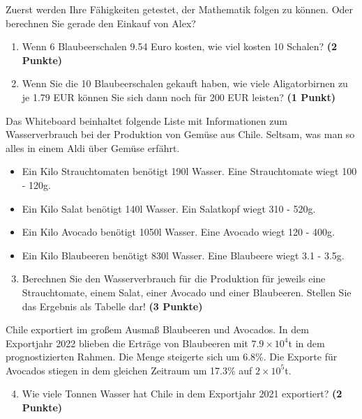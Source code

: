 \documentclass[a4paper, 9pt]{scrartcl}\usepackage[]{graphicx}\usepackage[]{xcolor}
\begin{document}
Zuerst werden Ihre Fähigkeiten getestet, der Mathematik folgen zu können. Oder berechnen Sie gerade den Einkauf von Alex?\\

\begin{enumerate}
\item Wenn 6 Blaubeerschalen 9.54 Euro kosten,  wie viel kosten 10 Schalen? \textbf{(2 Punkte)}
\item Wenn Sie die 10 Blaubeerschalen gekauft haben, wie viele Aligatorbirnen zu je 1.79 EUR können Sie sich dann noch für 200 EUR leisten? \textbf{(1 Punkt)}
\end{enumerate}

Das Whiteboard beinhaltet folgende Liste mit Informationen zum Wasserverbrauch bei der Produktion von Gemüse aus Chile. Seltsam, was man so alles in einem Aldi über Gemüse erfährt.
  
\begin{itemize}[noitemsep]
\item Ein Kilo Strauchtomaten benötigt 190l Wasser. Eine Strauchtomate wiegt 100 - 120g.
\item Ein Kilo Salat benötigt 140l Wasser. Ein Salatkopf wiegt 310 - 520g.
\item Ein Kilo Avocado benötigt 1050l Wasser. Eine Avocado wiegt 120 - 400g.
\item Ein Kilo Blaubeeren benötigt 830l Wasser. Eine Blaubeere wiegt 3.1 - 3.5g.
\end{itemize}

\begin{enumerate}
  \setcounter{enumi}{2}
\item Berechnen Sie den Wasserverbrauch für die Produktion für jeweils eine Strauchtomate, einem Salat, einer Avocado und einer Blaubeeren. Stellen Sie das Ergebnis als Tabelle dar! \textbf{(3 Punkte)}
\end{enumerate}

Chile exportiert im großem Ausmaß Blaubeeren und Avocados. In dem Exportjahr 2022 blieben die Erträge von Blaubeeren mit \ensuremath{7.9\times 10^{4}}t in dem prognostizierten Rahmen. Die Menge steigerte sich um 6.8\%. Die Exporte für Avocados stiegen in dem gleichen Zeitraum um 17.3\% auf \ensuremath{2\times 10^{5}}t.

\begin{enumerate}
  \setcounter{enumi}{3}
\item Wie viele Tonnen Wasser hat Chile in dem Exportjahr 2021 exportiert? \textbf{(2 Punkte)}
\end{enumerate}
\end{document}
